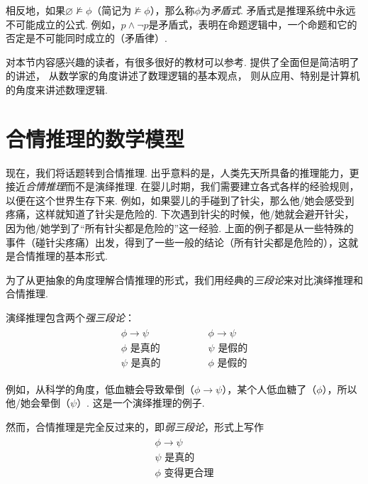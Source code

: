 相反地，如果$\varnothing\nvDash \phi$（简记为$\nvDash\phi$），那么称$\phi$为\textit{矛盾式}. 矛盾式是推理系统中永远不可能成立的公式. 例如，$p\wedge\neg p$是矛盾式，表明在命题逻辑中，一个命题和它的否定是不可能同时成立的（矛盾律）.

\begin{remark}
    对本节内容感兴趣的读者，有很多很好的教材可以参考. \cite{vandalenLogicStructure2013} 提供了全面但是简洁明了的讲述，\cite{hamiltonLogicMathematicians1988} 从数学家的角度讲述了数理逻辑的基本观点，\cite{nerodeLogicApplications1997} 则从应用、特别是计算机的角度来讲述数理逻辑. 
\end{remark}

\section{合情推理的数学模型}

现在，我们将话题转到合情推理. 出乎意料的是，人类先天所具备的推理能力，更接近\textit{合情推理}而不是演绎推理. 在婴儿时期，我们需要建立各式各样的经验规则，以便在这个世界生存下来. 例如，如果婴儿的手碰到了针尖，那么他/她会感受到疼痛，这样就知道了针尖是危险的. 下次遇到针尖的时候，他/她就会避开针尖，因为他/她学到了“所有针尖都是危险的”这一经验. 上面的例子都是从一些特殊的事件（碰针尖疼痛）出发，得到了一些一般的结论（所有针尖都是危险的），这就是合情推理的基本形式.

为了从更抽象的角度理解合情推理的形式，我们用经典的\textit{三段论}来对比演绎推理和合情推理. 

演绎推理包含两个\textit{强三段论}：
    \[
        \begin{array}{c}
            \begin{array}{c}  
                \phi \to \psi \\ \phi\text{ 是真的} \\ \hline \psi\text{ 是真的}
            \end{array} 
            \qquad \qquad 
            \begin{array}{c}  
                \phi \to \psi \\ \psi\text{ 是假的} \\ \hline \phi\text{ 是假的}
            \end{array}
        \end{array} 
    \]

例如，从科学的角度，低血糖会导致晕倒（$\phi\to \psi$），某个人低血糖了（$\phi$），所以他/她会晕倒（$\psi$）. 这是一个演绎推理的例子.

然而，合情推理是完全反过来的，即\textit{弱三段论}，形式上写作 
        \[
        \begin{array}{c}
            \begin{array}{c}  
                \phi \to \psi \\ \psi\text{ 是真的} \\ \hline \phi\text{ 变得更合理}
            \end{array} 
        \end{array} 
    \]

